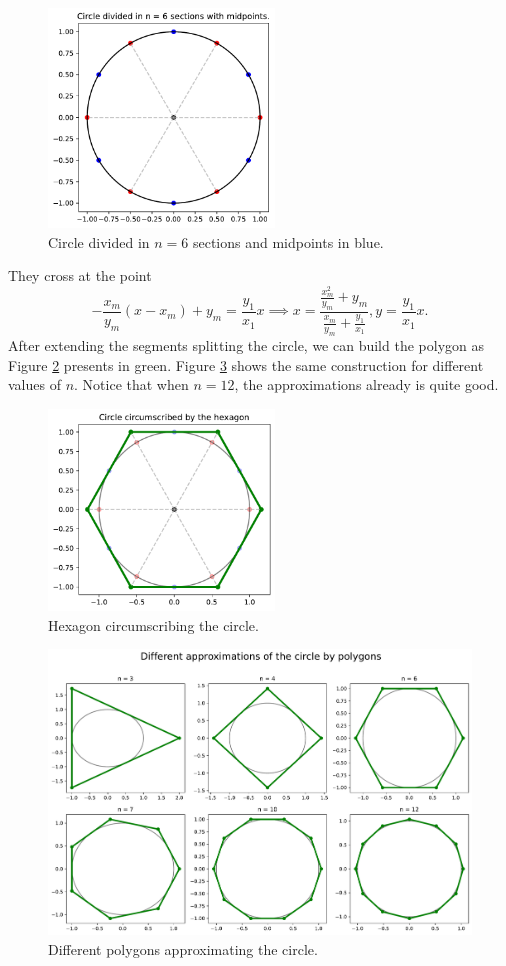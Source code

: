 \documentclass[a4paper,10pt, notitlepage]{report}
\begin{document}
\begin{figure}[htpb]
    \centering
    \includegraphics[width=6cm]{images/figure2.pdf}
    \caption{\label{fig:figure2}Circle divided in $n=6$ sections and midpoints
    in blue.}
\end{figure}

They cross at the point
$$
-\frac{x_m}{y_m}(x - x_m) + y_m = \frac{y_1}{x_1}x \implies x = \dfrac{\frac{x_m^2}{y_m} + y_m}{\frac{x_m}{y_m} + \frac{y_1}{x_1}}, 
y = \frac{y_1}{x_1}x.
$$
After extending the segments splitting the circle, we can build the polygon
as Figure \ref{fig:figure3} presents in green. Figure \ref{fig:figure4} shows
the same construction for different values of $n$. Notice that when $n=12$,
the approximations already is quite good. 

\begin{figure}[htpb]
    \centering
    \includegraphics[width=6cm]{images/figure3.pdf}
    \caption{\label{fig:figure3}Hexagon circumscribing the circle.}
\end{figure}

\begin{figure}[htpb]
    \centering
    \includegraphics[width=12cm]{images/figure4.pdf}
    \caption{\label{fig:figure4}Different polygons approximating the circle.}
\end{figure}
\end{document}
